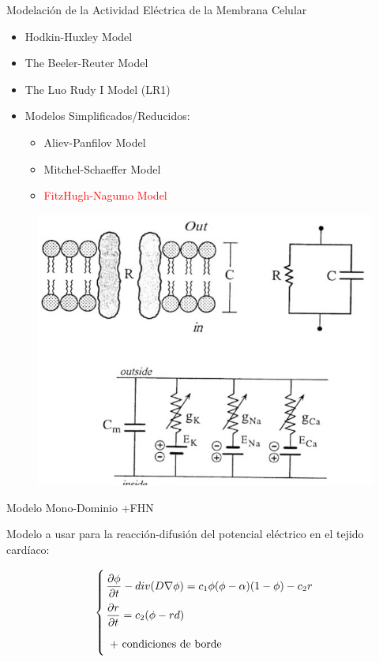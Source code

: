 \documentclass[11pt,spanish]{beamer}
\newcommand{\red}{\textcolor{red}}
\begin{document}
\begin{frame}{Modelación de la Actividad Eléctrica de la Membrana Celular}

\begin{itemize}
\item Hodkin-Huxley Model
\item The Beeler-Reuter Model
\item The Luo Rudy I Model (LR1) \pause
\item Modelos Simplificados/Reducidos:
\begin{itemize}
\item Aliev-Panfilov Model
\item Mitchel-Schaeffer Model \pause
\item \red{FitzHugh-Nagumo Model}
\end{itemize}
\end{itemize}
\begin{figure}[H]
\centering
\includegraphics[height = 3.1 cm]{fig/membrana_1}
\end{figure}
\end{frame}

\begin{frame}{Modelo Mono-Dominio +FHN}

Modelo a usar para la reacción-difusión del potencial eléctrico en el tejido cardíaco:

\begin{equation}
\arraycolsep=1.4pt\def\arraystretch{2.2}
\left\lbrace
\begin{array}{lr}
\dfrac{\partial \phi}{ \partial t} - div(D \nabla \phi) = c_1 \phi (\phi - \alpha)(1 - \phi) - c_2 r \\ 
\dfrac{\partial r}{\partial t} = c_2 (\phi - rd)\\
\text{ + condiciones de borde }
\end{array}
\right. \label{modelo_final}
\end{equation}
\end{frame}
\end{document}
